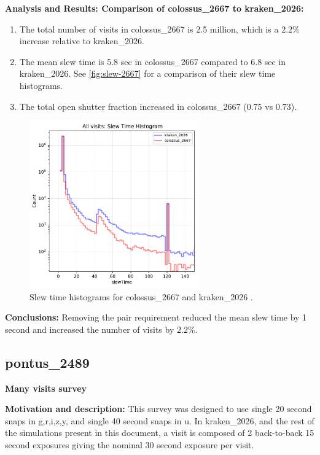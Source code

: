 \documentclass[DM,lsstdraft,authoryear,toc]{lsstdoc}
\begin{document}
\textbf{Analysis and Results: Comparison of colossus\_2667 to kraken\_2026:}

\begin{enumerate}
\item The total number of visits in colossus\_2667 is 2.5 million, which is a $2.2\%$ increase relative to kraken\_2026.
\item The mean slew time is 5.8 sec in colossus\_2667 compared to 6.8 sec in kraken\_2026.
See \autoref{fig:slew-2667} for a comparison of their slew time histograms.
\item The total open shutter fraction increased in colossus\_2667 (0.75 vs 0.73).
\end{enumerate}

\begin{figure}[ht]
\centering
\includegraphics[width=0.65\textwidth]{figures/kraken_2026_colossus_2667_Slew_Time_Histogram_All_visits_ONED_ComboBinnedData.pdf}
\caption{Slew time histograms for colossus\_2667 and kraken\_2026 .}
\label{fig:slew-2667}
\end{figure}

\textbf{Conclusions:} Removing the pair requirement reduced the mean slew time by 1 second and increased the number of
visits by $2.2\%$.

\subsection{pontus\_2489} \label{pontus2489}

\textbf{Many visits survey}

\textbf{Motivation and description:} This survey was designed to use single 20 second snaps in
g,r,i,z,y, and single 40 second snaps in u. In kraken\_2026, and the rest of the simulations present in this document, 
a visit is composed of 2 back-to-back 15 second exposures giving the nominal 30 second exposure per visit. 
\end{document}
